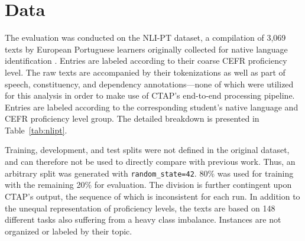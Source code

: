 
\section{Data}
\label{section:data}

The evaluation was conducted on the NLI-PT dataset, a compilation of 3,069 texts by European Portuguese learners originally collected for native language identification \citep{delrio2018, delrio2019a}. Entries are labeled according to their coarse CEFR proficiency level. The raw texts are accompanied by their tokenizations as well as part of speech, constituency, and dependency annotations—none of which were utilized for this analysis in order to make use of CTAP's end-to-end processing pipeline. Entries are labeled according to the corresponding student's native language and CEFR proficiency level group. The detailed breakdown is presented in Table~\ref{tab:nlipt}.

\begin{table}[ht]
\renewcommand{\arraystretch}{1.2}
    \centering
    \caption{Number of texts in NLI-PT, by CEFR level group and {\scshape l1}.}
    \label{tab:nlipt}
\end{table}

Training, development, and test splits were not defined in the original dataset, and can therefore not be used to directly compare with previous work. Thus, an arbitrary split was generated with \texttt{random\_state=42}. 80\% was used for training with the remaining 20\% for evaluation. The division is further contingent upon CTAP's output, the sequence of which is inconsistent for each run. In addition to the unequal representation of proficiency levels, the texts are based on 148 different tasks also suffering from a heavy class imbalance. Instances are not organized or labeled by their topic.
